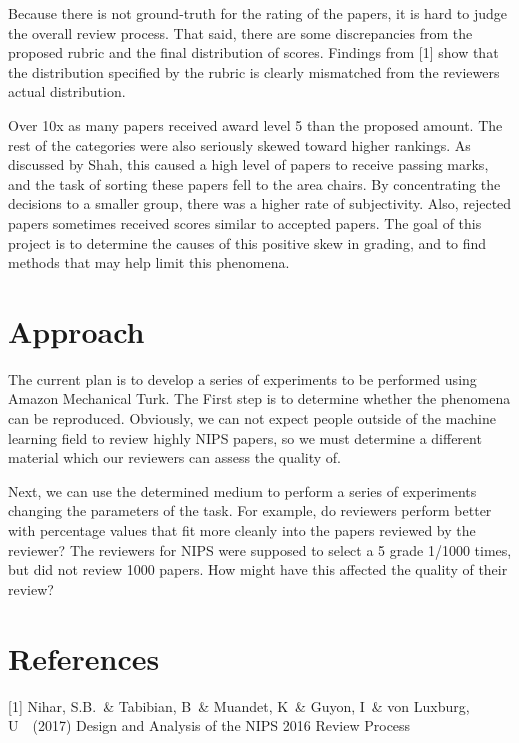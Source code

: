 \documentclass{article}
\begin{document}
Because there is not ground-truth for the rating of the papers, it is hard to judge the overall review process. That said, there are some discrepancies from the proposed rubric and the final distribution of scores. Findings from [1] show that the distribution specified by the rubric is clearly mismatched from the reviewers actual distribution.

Over 10x as many papers received award level 5 than the proposed amount. The rest of the categories were also seriously skewed toward higher rankings. As discussed by Shah, this caused a high level of papers to receive passing marks, and the task of sorting these papers fell to the area chairs. By concentrating the decisions to a smaller group, there was a higher rate of subjectivity. Also, rejected papers sometimes received scores similar to accepted papers. The goal of this project is to determine the causes of this positive skew in grading, and to find methods that may help limit this phenomena.

\section{Approach}

The current plan is to develop a series of experiments to be performed using Amazon Mechanical Turk.
The First step is to determine whether the phenomena can be reproduced. Obviously, we can not expect people outside of the machine learning field to review highly NIPS papers, so we must determine a different material which our reviewers can assess the quality of.

Next, we can use the determined medium to perform a series of experiments changing the parameters of the task. For example, do reviewers perform better with percentage values that fit more cleanly into the papers reviewed by the reviewer? The reviewers for NIPS were supposed to select a 5 grade 1/1000 times, but did not review 1000 papers. How might have this affected the quality of their review?


\section*{References}


\small

[1] Nihar, S.B.\ \& Tabibian, B\ \& Muandet, K\ \& Guyon, I\ \& von Luxburg, U\ \ (2017) Design and Analysis of the NIPS 2016 Review Process 
\end{document}
